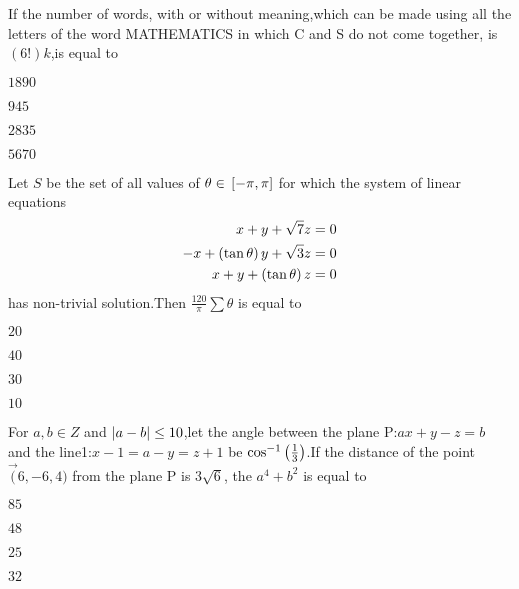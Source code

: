               \item  If the number of words, with or without meaning,which can be made using all the letters of the word MATHEMATICS in which C and S do not come together, is $(6!)k$,is equal to      
        \hfill{}\\
       \begin{enumerate}    
        \begin{multicols}{4}
                \item $1890$
                \item $945$
                \item $2835$
                \item $5670$
                \end{multicols}
              \end{enumerate}    

    \item Let $S$ be the set of all values of $\theta \in {}\left[-\pi,\pi\right]$ for which the system of linear equations \begin{align}
        x+y+\sqrt{7}z=0 \\
         -x+\left(\tan{\theta}\right)y+\sqrt{3}z=0 \\
          x+y+\left(\tan{\theta}\right)z=0 
    \end{align}
    has non-trivial solution.Then $\frac{120}{\pi}\sum \theta$ is equal to
        \hfill{}\\
       \begin{enumerate}    
        \begin{multicols}{4}
                \item $20$
                \item $40$
                \item $30$
                \item $10$
                \end{multicols}
              \end{enumerate}    

    \item For $a,b \in Z$ and $\left\vert a-b\right\vert \leq 10$,let the angle between the plane P:$ax+y-z=b$ and the line1:$x-1=a-y=z+1$ be $\cos^{-1}\left(\frac{1}{3}\right)$.If the distance of the point $\vec(6,-6,4)$ from the plane P is $3\sqrt{6}$, the $a^4+b^2$ is equal to
        \hfill{}\\
       \begin{enumerate}    
        \begin{multicols}{4}
                \item $85$
                \item $48$
                \item $25$
                \item $32$
                \end{multicols}
              \end{enumerate}    

